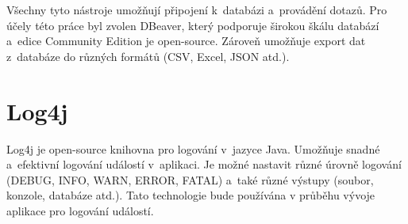 Všechny tyto nástroje umožňují připojení k~databázi a~provádění dotazů.  
Pro účely této práce byl zvolen DBeaver, který podporuje širokou škálu databází a~edice Community Edition je open-source.  
Zároveň umožňuje export dat z~databáze do různých formátů (CSV, Excel, JSON atd.).  
\cite{dbeaver}

\section{Log4j}
Log4j je open-source knihovna pro logování v~jazyce Java.
Umožňuje snadné a~efektivní logování událostí v~aplikaci.
Je možné nastavit různé úrovně logování (DEBUG, INFO, WARN, ERROR, FATAL) a~také různé výstupy 
(soubor, konzole, databáze atd.).
Tato technologie bude používána v průběhu vývoje aplikace pro logování událostí.
\cite{log4j}
